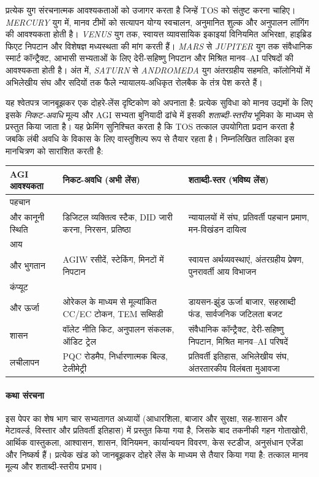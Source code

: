 \documentclass[11pt]{article}
\begin{document}
प्रत्येक युग संरचनात्मक आवश्यकताओं को उजागर करता है जिन्हें TOS को संतुष्ट करना चाहिए। \emph{MERCURY} युग में, मानव टीमों को सत्यापन योग्य स्वचालन, अनुमानित शुल्क और अनुपालन लॉगिंग की आवश्यकता होती है। \emph{VENUS} युग तक, स्वायत्त व्यावसायिक इकाइयां विनियमित अभिरक्षा, हाइब्रिड फिएट निपटान और विशेषज्ञ मध्यस्थता की मांग करती हैं। \emph{MARS} से \emph{JUPITER} युग तक संवैधानिक स्मार्ट कॉन्ट्रैक्ट, आभासी सभ्यताओं के लिए देरी-सहिष्णु निपटान और मिश्रित मानव--AI परिषदों की आवश्यकता होती है। अंत में, \emph{SATURN} से \emph{ANDROMEDA} युग अंतरग्रहीय सहमति, कॉलोनियों में अभिलेखीय संघ और सदियों तक फैले न्यायालय-अधिकृत रोलबैक के तंत्र पेश करते हैं।

यह श्वेतपत्र जानबूझकर एक दोहरे-लेंस दृष्टिकोण को अपनाता है: प्रत्येक सुविधा को मानव उद्यमों के लिए इसके \emph{निकट-अवधि} मूल्य और AGI सभ्यता बुनियादी ढांचे में इसकी \emph{शताब्दी-स्तरीय} भूमिका के माध्यम से प्रस्तुत किया जाता है। यह फ्रेमिंग सुनिश्चित करता है कि TOS तत्काल उपयोगिता प्रदान करता है जबकि लंबी अवधि के विकास के लिए वास्तुशिल्प रूप से तैयार रहता है। निम्नलिखित तालिका इस मानचित्रण को सारांशित करती है:

\begin{longtable}{@{}p{}p{}p{}@{}}
\toprule
\textbf{AGI आवश्यकता} & \textbf{निकट-अवधि (अभी लेंस)} & \textbf{शताब्दी-स्तर (भविष्य लेंस)} \\\midrule
पहचान \\ और कानूनी स्थिति & डिजिटल व्यक्तित्व स्टैक, DID जारी करना, निरसन, प्रतिष्ठा & न्यायालयों में संघ, प्रतिवर्ती पहचान प्रमाण, मन-विखंडन दायित्व \\
आय \\ और भुगतान & AGIW रसीदें, स्टेकिंग, मिनटों में निपटान & स्वायत्त अर्थव्यवस्थाएं, अंतरग्रहीय प्रेषण, पुनरावर्ती आय विभाजन \\
कंप्यूट \\ और ऊर्जा & ओरेकल के माध्यम से मूल्यांकित CC/EC टोकन, TEM सब्सिडी & डायसन-झुंड ऊर्जा बाजार, सहस्राब्दी फंड, सार्वजनिक जटिलता बजट \\
शासन & वॉलेट नीति किट, अनुपालन संकलक, ऑडिट ट्रेल & संवैधानिक कॉन्ट्रैक्ट, देरी-सहिष्णु निपटान, मिश्रित मानव--AI परिषदें \\
लचीलापन & PQC रोडमैप, निर्धारणात्मक बिल्ड, टेलीमेट्री & प्रतिवर्ती इतिहास, अभिलेखीय संघ, अंतरतारकीय विलंबता मुआवजा \\\bottomrule
\end{longtable}

\paragraph{कथा संरचना} इस पेपर का शेष भाग चार सभ्यतागत अध्यायों (आधारशिला, बाजार और सुरक्षा, सह-शासन और मेटावर्ल्ड, विस्तार और प्रतिवर्ती इतिहास) में प्रस्तुत किया गया है, जिसके बाद तकनीकी गहन गोताखोरी, आर्थिक वास्तुकला, आश्वासन, शासन, विनियमन, कार्यान्वयन विवरण, केस स्टडीज, अनुसंधान एजेंडा और निष्कर्ष हैं। प्रत्येक खंड को जानबूझकर दोहरे लेंस के माध्यम से तैयार किया गया है: तत्काल मानव मूल्य और शताब्दी-स्तरीय प्रभाव।
\end{document}

